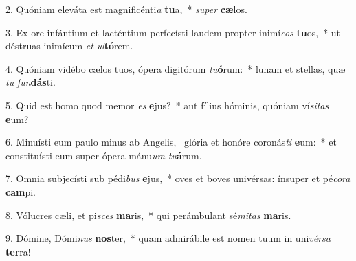 2. Quóniam eleváta est magnificénti\textit{a} \textbf{tu}a,~*  \textit{su}\textit{per} \textbf{cæ}los.\

3. Ex ore infántium et lacténtium perfecísti laudem propter inimí\textit{cos} \textbf{tu}os,~*  ut déstruas inimícum \textit{et} \textit{ul}\textbf{tó}rem.\

4. Quóniam vidébo cælos tuos, ópera digitórum \textit{tu}\textbf{ó}rum:~*  lunam et stellas, quæ \textit{tu} \textit{fun}\textbf{dás}ti.\

5. Quid est homo quod memor \textit{es} \textbf{e}jus?~*  aut fílius hóminis, quóniam ví\textit{si}\textit{tas} \textbf{e}um?\

6. Minuísti eum paulo minus ab Angelis, \dag\  glória et honóre coronás\textit{ti} \textbf{e}um:~*  et constituísti eum super ópera mánu\textit{um} \textit{tu}\textbf{á}rum.\

7. Omnia subjecísti sub pédi\textit{bus} \textbf{e}jus,~*  oves et boves univérsas: ínsuper et pé\textit{co}\textit{ra} \textbf{cam}pi.\

8. Vólucres cæli, et pi\textit{sces} \textbf{ma}ris,~*  qui perámbulant sé\textit{mi}\textit{tas} \textbf{ma}ris.\

9. Dómine, Dómi\textit{nus} \textbf{nos}ter,~*  quam admirábile est nomen tuum in uni\textit{vér}\textit{sa} \textbf{ter}ra!\

